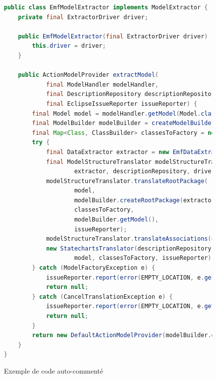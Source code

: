\begin{figure}[!ht]
\centering
\begin{lstlisting}[language=java]
public class EmfModelExtractor implements ModelExtractor {
    private final ExtractorDriver driver;

    public EmfModelExtractor(final ExtractorDriver driver) {
        this.driver = driver;
    }

    public ActionModelProvider extractModel(
            final ModelHandler modelHandler,
            final DescriptionRepository descriptionRepository,
            final EclipseIssueReporter issueReporter) {
        final Model model = modelHandler.getModel(Model.class);
        final ModelBuilder modelBuilder = createModelBuilder(model.getName());
        final Map<Class, ClassBuilder> classesToFactory = new TreeMap<Class, ClassBuilder>(NAMED_ELEMENTS_COMPARATOR);
        try {
            final DataExtractor extractor = new EmfDataExtractor(driver);
            final ModelStructureTranslator modelStructureTranslator = new ModelStructureTranslator(
                    extractor, descriptionRepository, driver);
            modelStructureTranslator.translateRootPackage(
                    model,
                    modelBuilder.createRootPackage(extractor.extractUniqueIdentifier(model), "root"),
                    classesToFactory,
                    modelBuilder.getModel(),
                    issueReporter);
            modelStructureTranslator.translateAssociations(classesToFactory, model, issueReporter);
            new StatechartsTranslator(descriptionRepository, driver).translateStatecharts(
                    model, classesToFactory, issueReporter);
        } catch (ModelFactoryException e) {
            issueReporter.report(error(EMPTY_LOCATION, e.getMessageBundle()));
            return null;
        } catch (CancelTranslationException e) {
            issueReporter.report(error(EMPTY_LOCATION, e.getMessageBundle()));
            return null;
        }
        return new DefaultActionModelProvider(modelBuilder.getModel());
    }
}
\end{lstlisting}
\caption{Exemple de code auto-commenté}
\label{figure:codeAutoCom}
\end{figure}

